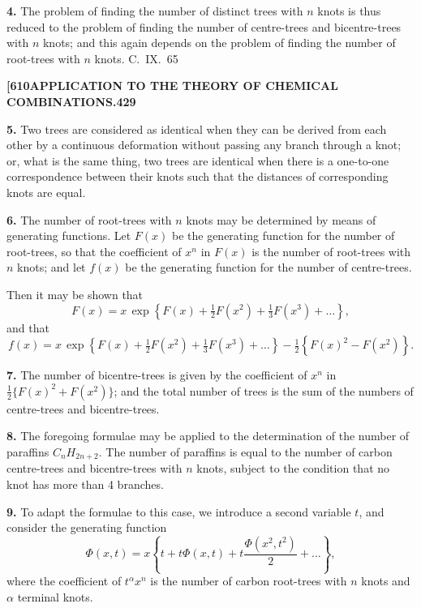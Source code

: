 \documentclass[11pt,a4paper]{book}
\begin{document}
{\medskip
\noindent\textbf{4.}
The problem of finding the number of distinct trees with $n$ knots is thus reduced to the problem of finding the number of centre-trees and bicentre-trees with $n$ knots; and this again depends on the problem of finding the number of root-trees with $n$ knots.
\hfill C.~IX.\ 65

\newpage
\noindent\textbf{[610}\hspace{\fill}\textbf{APPLICATION TO THE THEORY OF CHEMICAL COMBINATIONS.}\hspace{\fill}\textbf{429}

\noindent\textbf{5.}
Two trees are considered as identical when they can be derived from each other by a continuous deformation without passing any branch through a knot; or, what is the same thing, two trees are identical when there is a one-to-one correspondence between their knots such that the distances of corresponding knots are equal.

\medskip
\noindent\textbf{6.}
The number of root-trees with $n$ knots may be determined by means of generating functions. Let $F(x)$ be the generating function for the number of root-trees, so that the coefficient of $x^n$ in $F(x)$ is the number of root-trees with $n$ knots; and let $f(x)$ be the generating function for the number of centre-trees.

Then it may be shown that
\[
F(x) = x\, \exp\left\{F(x) + \tfrac{1}{2}F(x^2) + \tfrac{1}{3}F(x^3) + \ldots\right\},
\]
and that
\[
f(x) = x\, \exp\left\{F(x) + \tfrac{1}{2}F(x^2) + \tfrac{1}{3}F(x^3) + \ldots\right\} - \tfrac{1}{2}\left\{F(x)^2 - F(x^2)\right\}.
\]

\medskip
\noindent\textbf{7.}
The number of bicentre-trees is given by the coefficient of $x^n$ in $\frac{1}{2}\{F(x)^2 + F(x^2)\}$; and the total number of trees is the sum of the numbers of centre-trees and bicentre-trees.

\medskip
\noindent\textbf{8.}
The foregoing formulae may be applied to the determination of the number of paraffins $C_nH_{2n+2}$. The number of paraffins is equal to the number of carbon centre-trees and bicentre-trees with $n$ knots, subject to the condition that no knot has more than 4 branches.

\medskip
\noindent\textbf{9.}
To adapt the formulae to this case, we introduce a second variable $t$, and consider the generating function
\[
\Phi(x,t) = x\left\{t + t\Phi(x,t) + t\frac{\Phi(x^2,t^2)}{2} + \ldots\right\},
\]
where the coefficient of $t^\alpha x^n$ is the number of carbon root-trees with $n$ knots and $\alpha$ terminal knots.

}
\end{document}
